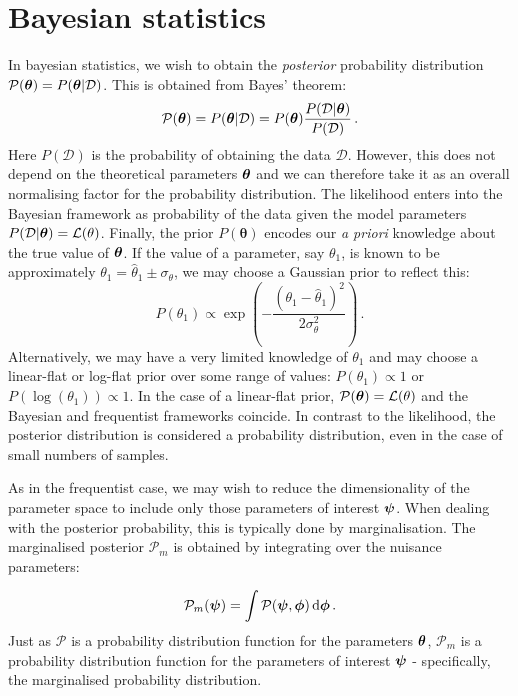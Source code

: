 \section{Bayesian statistics}

In bayesian statistics, we wish to obtain the \textit{posterior} probability distribution $\mathcal{P}(\boldsymbol\theta) = P(\boldsymbol\theta|\mathcal{D})$. This is obtained from Bayes' theorem:
\begin{equation}
\mathcal{P}(\boldsymbol\theta) = P(\boldsymbol\theta|\mathcal{D}) = P(\boldsymbol\theta) \frac{P(\mathcal{D}|\boldsymbol\theta)}{P(\mathcal{D})}\,.
\end{equation}
Here $P(\mathcal{D})$ is the probability of obtaining the data $\mathcal{D}$. However, this does not depend on the theoretical parameters $\boldsymbol\theta$ and we can therefore take it as an overall normalising factor for the probability distribution. The likelihood enters into the Bayesian framework as probability of the data given the model parameters $P(\mathcal{D}|\boldsymbol\theta) = \mathcal{L}(\bold\theta)$. Finally, the prior $P(\boldsymbol\theta)$ encodes our \textit{a priori} knowledge about the true value of $\boldsymbol\theta$. If the value of a parameter, say $\theta_1$, is known to be approximately $\theta_1 = \hat{\theta}_1 \pm \sigma_\theta$, we may choose a Gaussian prior to reflect this:
\begin{equation}
P(\theta_1) \propto \exp\left(-\frac{(\theta_1 - \hat{\theta}_1)^2}{2\sigma_\theta^2}\right)\,.
\end{equation}
Alternatively, we may have a very limited knowledge of $\theta_1$ and may choose a linear-flat or log-flat prior over some range of values: $P(\theta_1) \propto 1$ or $P(\log(\theta_1)) \propto 1$. In the case of a linear-flat prior, $\mathcal{P}(\boldsymbol\theta) = \mathcal{L}(\theta)$ and the Bayesian and frequentist frameworks coincide. In contrast to the likelihood, the posterior distribution is considered a probability distribution, even in the case of small numbers of samples.

As in the frequentist case, we may wish to reduce the dimensionality of the parameter space to include only those parameters of interest $\boldsymbol\psi$. When dealing with the posterior probability, this is typically done by marginalisation. The marginalised posterior $\mathcal{P}_m$ is obtained by integrating over the nuisance parameters:

\begin{equation}
\mathcal{P}_m(\boldsymbol\psi) = \int \mathcal{P}(\boldsymbol\psi, \boldsymbol\phi) \, \textrm{d}\boldsymbol\phi\,.
\end{equation}
Just as $\mathcal{P}$ is a probability distribution function for the parameters $\boldsymbol\theta$, $\mathcal{P}_m$ is a probability distribution function for the parameters of interest $\boldsymbol\psi$ - specifically, the marginalised probability distribution.

